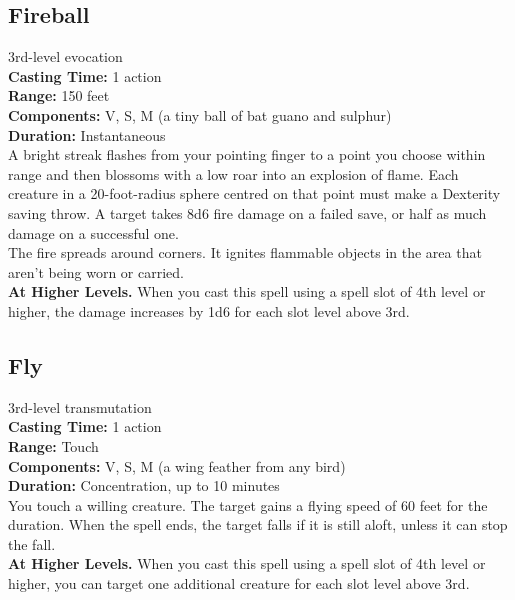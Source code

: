 \documentclass[11pt, A4paper, english]{article}
\begin{document}
		\subsection{Fireball}
3rd-level evocation \\
\textbf{Casting Time:} 1 action \\
\textbf{Range:} 150 feet \\
\textbf{Components:} V, S, M (a tiny ball of bat guano and sulphur) \\
\textbf{Duration:} Instantaneous \\
A bright streak flashes from your pointing finger to a point you choose within range and then blossoms with a low roar into an explosion of flame. Each creature in a 20-foot-radius sphere centred on that point must make a Dexterity saving throw. A target takes 8d6 fire damage on a failed save, or half as much damage on a successful one. \\
The fire spreads around corners. It ignites flammable objects in the area that aren't being worn or carried. \\
\textbf{At Higher Levels.} When you cast this spell using a spell slot of 4th level or higher, the damage increases by 1d6 for each slot level above 3rd.

		\subsection{Fly}
3rd-level transmutation \\
\textbf{Casting Time:} 1 action \\
\textbf{Range:} Touch \\
\textbf{Components:} V, S, M (a wing feather from any bird) \\
\textbf{Duration:} Concentration, up to 10 minutes \\
You touch a willing creature. The target gains a flying speed of 60 feet for the duration. When the spell ends, the target falls if it is still aloft, unless it can stop the fall. \\
\textbf{At Higher Levels.} When you cast this spell using a spell slot of 4th level or higher, you can target one additional creature for each slot level above 3rd.
\end{document}
